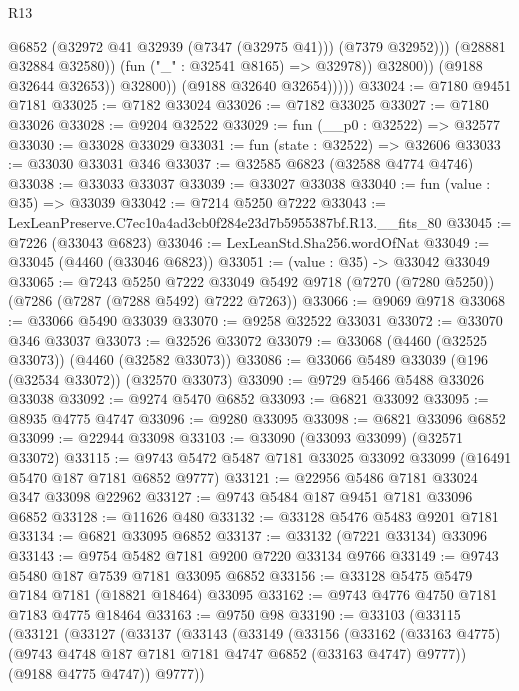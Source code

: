 \begin{lexlean}{R13}
\begin{coremodule}
                              @6852
                              (@32972 @41 @32939 (@7347 (@32975 @41)))
                              (@7379 @32952)))
                          (@28881 @32884 @32580))
                        (fun ("_" : @32541 @8165) => @32978))
                      @32800))
                  (@9188 @32644 @32653))
                @32800))
            (@9188 @32640 @32654)))))
@33024 := @7180 @9451 @7181
@33025 := @7182 @33024
@33026 := @7182 @33025
@33027 := @7180 @33026
@33028 := @9204 @32522
@33029 := fun (__p0 : @32522) => @32577
@33030 := @33028 @33029
@33031 := fun (state : @32522) => @32606
@33033 := @33030 @33031 @346
@33037 := @32585 @6823 (@32588 @4774 @4746)
@33038 := @33033 @33037
@33039 := @33027 @33038
@33040 := fun (value : @35) => @33039
@33042 := @7214 @5250 @7222
@33043 := LexLeanPreserve.C7ec10a4ad3cb0f284e23d7b5955387bf.R13.__fits_80
@33045 := @7226 (@33043 @6823)
@33046 := LexLeanStd.Sha256.wordOfNat
@33049 := @33045 (@4460 (@33046 @6823))
@33051 := (value : @35) -> @33042 @33049
@33065 := @7243
    @5250
    @7222
    @33049
    @5492
    @9718
    (@7270 (@7280 @5250))
    (@7286 (@7287 (@7288 @5492) @7222 @7263))
@33066 := @9069 @9718
@33068 := @33066 @5490 @33039
@33070 := @9258 @32522 @33031
@33072 := @33070 @346 @33037
@33073 := @32526 @33072
@33079 := @33068 (@4460 (@32525 @33073)) (@4460 (@32582 @33073))
@33086 := @33066 @5489 @33039 (@196 (@32534 @33072)) (@32570 @33073)
@33090 := @9729 @5466 @5488 @33026 @33038
@33092 := @9274 @5470 @6852
@33093 := @6821 @33092
@33095 := @8935 @4775 @4747
@33096 := @9280 @33095
@33098 := @6821 @33096 @6852
@33099 := @22944 @33098
@33103 := @33090 (@33093 @33099) (@32571 @33072)
@33115 := @9743 @5472 @5487 @7181 @33025 @33092 @33099 (@16491 @5470 @187 @7181 @6852 @9777)
@33121 := @22956 @5486 @7181 @33024 @347 @33098 @22962
@33127 := @9743 @5484 @187 @9451 @7181 @33096 @6852
@33128 := @11626 @480
@33132 := @33128 @5476 @5483 @9201 @7181
@33134 := @6821 @33095 @6852
@33137 := @33132 (@7221 @33134) @33096
@33143 := @9754 @5482 @7181 @9200 @7220 @33134 @9766
@33149 := @9743 @5480 @187 @7539 @7181 @33095 @6852
@33156 := @33128 @5475 @5479 @7184 @7181 (@18821 @18464) @33095
@33162 := @9743 @4776 @4750 @7181 @7183 @4775 @18464
@33163 := @9750 @98
@33190 := @33103
    (@33115
      (@33121
        (@33127
          (@33137
            (@33143
              (@33149
                (@33156
                  (@33162
                    (@33163 @4775)
                    (@9743 @4748 @187 @7181 @7181 @4747 @6852 (@33163 @4747) @9777))
                  (@9188 @4775 @4747))
                @9777))

\end{coremodule}
\end{lexlean}
